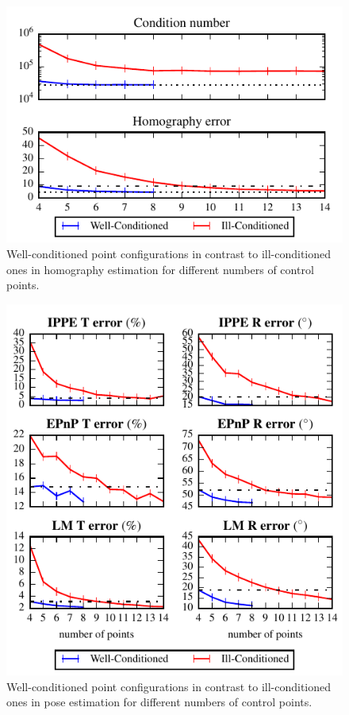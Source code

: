 \documentclass[letterpaper, 10 pt, conference]{ieeeconf}  %
\begin{document}
	\begin{figure}[t]
		\begin{center}
			\includegraphics[width=\columnwidth]{img/point_config_comp_homo.pdf}
			\caption{\label{fig:comp_homo}\small Well-conditioned point configurations in contrast to ill-conditioned ones in homography estimation for different numbers of control points.}
		\end{center}
		\vspace{-0.5cm}
	\end{figure}
	
	
	\begin{figure}[t]
		\begin{center}
			\includegraphics[width=\columnwidth]{img/point_config_comp_pose.pdf}
			\caption{\label{fig:comp_pose}\small Well-conditioned point configurations in contrast to ill-conditioned ones in pose estimation for different numbers of control points.}
		\end{center}
		\vspace{-0.5cm}
	\end{figure}
	
\end{document}
